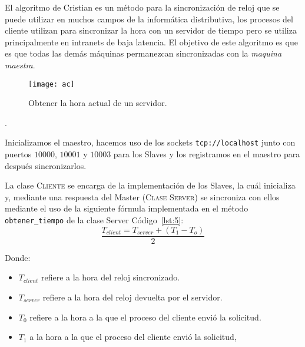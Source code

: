 
El algoritmo de Cristian es un método para la sincronización de reloj que se
puede utilizar en muchos campos de la informática distributiva, los procesos
del cliente utilizan para sincronizar la hora con un servidor de
tiempo pero se utiliza principalmente en intranets de baja latencia.
El objetivo de este algoritmo es que es que todas las demás máquinas permanezcan sincronizadas con la \textit{maquina maestra}.
\begin{figure}[H]
  \centering
  \texttt{[image: ac]}
  \caption{Obtener la hora actual de un servidor.}\label{fig:4}
\end{figure}.


Inicializamos el maestro, hacemos uso de los sockets
\texttt{tcp://localhost} junto con  puertos
$10000$, $10001$ y $10003$ para los Slaves y los registramos en el maestro
para después sincronizarlos.

\clearpage

La clase \textsc{Cliente} se encarga de la implementación de los Slaves,
la cuál inicializa y, mediante una respuesta del Master (\textsc{Clase Server})
se sincroniza con ellos mediante el uso de la siguiente fórmula implementada
en el método \texttt{obtener_tiempo} de la clase Server Código~\ref{lst:5}:
\begin{equation}
  \label{eq:1}
  \frac{T_{client}= T_{server}+(T_{1}-T_{o})}{2}
\end{equation}

Donde:

\begin{itemize}
  \item $T_{client}$ refiere a la hora del reloj sincronizado.
  \item $T_{server}$ refiere a la hora del reloj devuelta por el servidor.
  \item $T_{0}$ refiere  a la hora a la que el proceso del cliente envió la
        solicitud.
  \item $T_{1}$  a la hora a la que el proceso del cliente envió la solicitud,
\end{itemize}

